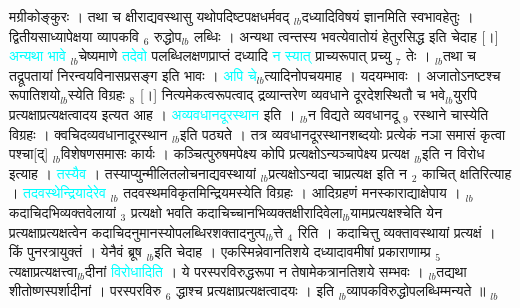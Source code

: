 \documentclass[article,12pt,a4paper]{memoir}%
\newcommand{\quotelemma}[1]{\textcolor{cyan}{#1}}
\newcounter{parCount}
\begin{document}
मग्रीकोङ्कुरः । तथा च क्षीराद्यवस्थासु यथोपदिष्टपक्षधर्मवद् {\tiny $_{lb}$}दध्यादिविषयं ज्ञानमिति स्वभावहेतुः । द्वितीयसाध्यापेक्षया व्यापकवि {\tiny $_{6}$} रुद्धोप{\tiny $_{lb}$} \leavevmode{} लब्धिः । अन्यथा त्वन्तस्य भवत्येवातोयं हेतुरसिद्ध इति चेदाह [।] \quotelemma{अन्यथा भावे} {\tiny $_{lb}$}चेष्यमाणे \quotelemma{तदेवो} पलब्धिलक्षणप्राप्तं दध्यादि \quotelemma{न स्यात्} \cite[4b1]{vn-msN} प्राच्यरूपात् प्रच्यु {\tiny $_{7}$} तेः । {\tiny $_{lb}$}तथा च तद्रूपतायां निरन्वयविनासप्रसङ्ग इति भावः । \quotelemma{अपि चे}{\tiny $_{lb}$}\cite[4b1]{vn-msN}त्यादिनोपचयमाह । यदयम्भावः । अजातोऽनष्टश्च रूपातिशयो{\tiny $_{lb}$}स्येति विग्रहः {\tiny $_{8}$} [।] नित्यमेकत्वरूपत्वाद् द्रव्यान्तरेण व्यवधाने दूरदेशस्थितौ च भवे{\tiny $_{lb}$}युरपि प्रत्यक्षाप्रत्यक्षत्वादय इत्यत आह । \quotelemma{अव्यवधानदूरस्थान} \cite[4b1]{vn-msN} इति । {\tiny $_{lb}$}न विद्यते व्यवधानदू {\tiny $_{9}$} \leavevmode{} रस्थाने चास्येति विग्रहः । क्वचिदव्यवधानादूरस्थान {\tiny $_{lb}$}इति पठ्यते । तत्र व्यवधानदूरस्थानशब्दयोः प्रत्येकं नञा समासं कृत्वा पश्चा[द्] {\tiny $_{lb}$}विशेषणसमासः कार्यः । कञ्चित्पुरुषमपेक्ष्य कोपि प्रत्यक्षोऽन्यञ्चापेक्ष्य प्रत्यक्ष {\tiny $_{lb}$}इति न विरोध इत्याह । \quotelemma{तस्यैव} \cite[4b2]{vn-msN} । तस्याप्युन्मीलितलोचनाद्यवस्थायां {\tiny $_{lb}$}प्रत्यक्षोऽन्यदा चाप्रत्यक्ष इति न {\tiny $_{2}$} काचित् क्षतिरित्याह । \quotelemma{तदवस्थेन्द्रियादेरेव} {\tiny $_{lb}$} \cite[4b2]{vn-msN} तदवस्थमविकृतमिन्द्रियमस्येति विग्रहः । आदिग्रहणं मनस्काराद्याक्षेपाय । {\tiny $_{lb}$}कदाचिदभिव्यक्तवेलायां {\tiny $_{3}$} प्रत्यक्षो भवति कदाचिच्चानभिव्यक्तक्षीरादिवेला{\tiny $_{lb}$}यामप्रत्यक्षश्चेति येन प्रत्यक्षाप्रत्यक्षत्वेन कदाचिदनुमानस्योपलब्धिरशक्तादनुत्प{\tiny $_{lb}$}त्ते {\tiny $_{4}$} रिति । कदाचित्तु व्यक्तावस्थायां प्रत्यक्षं । किं पुनरत्रायुक्तं । येनैवं ब्रूष {\tiny $_{lb}$}इति चेदाह । एकस्मिन्नेवानतिशये दध्यादावमीषां प्रकाराणाम्प्र {\tiny $_{5}$} त्यक्षाप्रत्यक्षत्त्वा{\tiny $_{lb}$}दीनां \quotelemma{विरोधादिति} \cite[4b2]{vn-msN} । ये परस्परविरुद्धरूपा न तेषामेकत्रानतिशये सम्भवः । {\tiny $_{lb}$}तद्यथा शीतोष्णस्पर्शादीनां । परस्परविरु {\tiny $_{6}$} द्धाश्च प्रत्यक्षाप्रत्यक्षत्वादयः । इति {\tiny $_{lb}$}व्यापकविरुद्धोपलब्धिम्मन्यते ॥
	{}
	\pend%
      {\tiny $_{lb}$}
\end{document}
